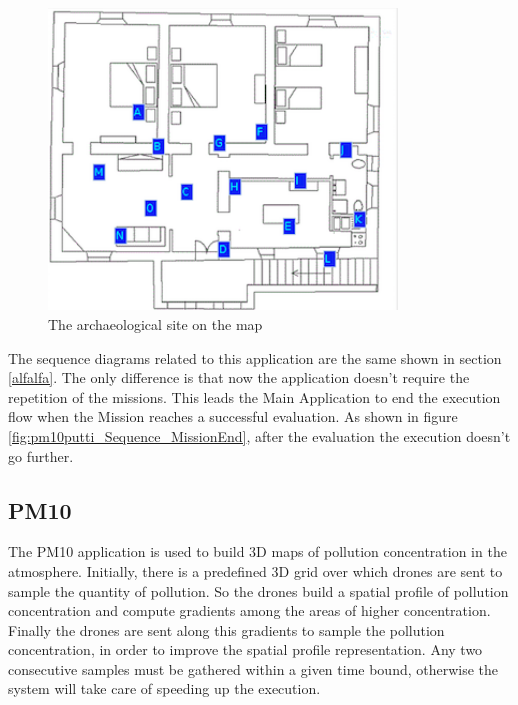 \begin{figure}[H]
\centering
\includegraphics[width=\linewidth, height=8cm]{pictures/puttiArea.png}
\caption{The archaeological site on the map}
\label{fig:puttiArea}
\end{figure}

The sequence diagrams related to this application are the same shown in section \ref{alfalfa}. 
The only difference is that now the application doesn't require the repetition of the missions.
This leads the Main Application to end the execution flow when the Mission reaches a successful evaluation.
As shown in figure \ref{fig:pm10putti_Sequence_MissionEnd}, after the evaluation the execution doesn't go further.



\subsection{PM10}

The PM10\cite{pm10} application is used to build 3D maps of pollution concentration in the atmosphere. 
Initially, there is a predefined 3D grid over which drones are sent to sample the quantity of pollution.
So the drones build a spatial profile of pollution concentration and compute gradients among the areas of higher concentration.
Finally the drones are sent along this gradients to sample the pollution concentration, in order to improve the spatial profile representation.
Any two consecutive samples must be gathered within a given time bound, otherwise the system will take care of speeding up the execution.

